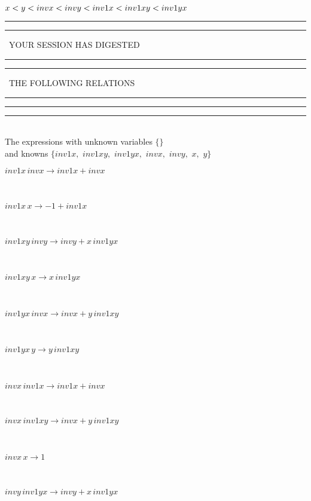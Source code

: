 $
x<y<invx<invy<inv1x<inv1xy<inv1yx\\
$
\rule[2pt]{6in}{4pt}\hfil\break
\rule[2pt]{1.879in}{4pt}
\ YOUR SESSION HAS DIGESTED\ 
\rule[2pt]{1.879in}{4pt}\hfil\break
\rule[2pt]{1.923in}{4pt}
\ THE FOLLOWING RELATIONS\ 
\rule[2pt]{1.923in}{4pt}\hfil\break
\rule[2pt]{6in}{4pt}\hfil\break
\rule[3pt]{6in}{.7pt}\\
The expressions with unknown variables $\{\}$\\
and knowns $\{inv1x,
$ $
inv1xy,
$ $
inv1yx,
$ $
invx,
$ $
invy,
$ $
x,
$ $
y\}$\smallskip\\
\begin{minipage}{6in}
$
inv1x\,
 invx\rightarrow inv1x + invx
$
\end{minipage}\medskip \\
\begin{minipage}{6in}
$
inv1x\,
 x\rightarrow -1 + inv1x
$
\end{minipage}\medskip \\
\begin{minipage}{6in}
$
inv1xy\,
 invy\rightarrow invy + x\,
 inv1yx
$
\end{minipage}\medskip \\
\begin{minipage}{6in}
$
inv1xy\,
 x\rightarrow x\,
 inv1yx
$
\end{minipage}\medskip \\
\begin{minipage}{6in}
$
inv1yx\,
 invx\rightarrow invx + y\,
 inv1xy
$
\end{minipage}\medskip \\
\begin{minipage}{6in}
$
inv1yx\,
 y\rightarrow y\,
 inv1xy
$
\end{minipage}\medskip \\
\begin{minipage}{6in}
$
invx\,
 inv1x\rightarrow inv1x + invx
$
\end{minipage}\medskip \\
\begin{minipage}{6in}
$
invx\,
 inv1xy\rightarrow invx + y\,
 inv1xy
$
\end{minipage}\medskip \\
\begin{minipage}{6in}
$
invx\,
 x\rightarrow 1
$
\end{minipage}\medskip \\
\begin{minipage}{6in}
$
invy\,
 inv1yx\rightarrow invy + x\,
 inv1yx
$
\end{minipage}\medskip \\
